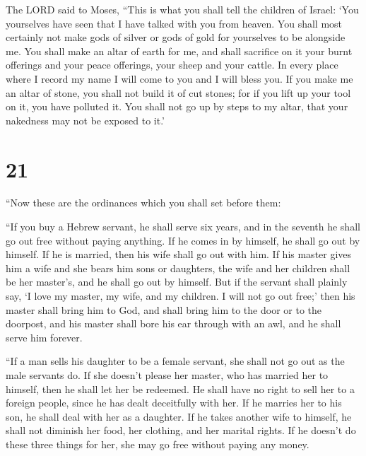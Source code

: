  The LORD said to Moses, ``This is what you shall tell
the children of Israel: `You yourselves have seen that I have talked
with you from heaven.  You shall most certainly not make
gods of silver or gods of gold for yourselves to be alongside me.
 You shall make an altar of earth for me, and shall
sacrifice on it your burnt offerings and your peace offerings, your
sheep and your cattle. In every place where I record my name I will come
to you and I will bless you.  If you make me an altar of
stone, you shall not build it of cut stones; for if you lift up your
tool on it, you have polluted it.  You shall not go up by
steps to my altar, that your nakedness may not be exposed to it.'

\hypertarget{section-20}{%
\section{21}\label{section-20}}

 ``Now these are the ordinances which you shall set before
them:

 ``If you buy a Hebrew servant, he shall serve six years,
and in the seventh he shall go out free without paying anything.
 If he comes in by himself, he shall go out by himself. If
he is married, then his wife shall go out with him.  If
his master gives him a wife and she bears him sons or daughters, the
wife and her children shall be her master's, and he shall go out by
himself.  But if the servant shall plainly say, `I love my
master, my wife, and my children. I will not go out free;'
 then his master shall bring him to God, and shall bring
him to the door or to the doorpost, and his master shall bore his ear
through with an awl, and he shall serve him forever.

 ``If a man sells his daughter to be a female servant, she
shall not go out as the male servants do.  If she doesn't
please her master, who has married her to himself, then he shall let her
be redeemed. He shall have no right to sell her to a foreign people,
since he has dealt deceitfully with her.  If he marries
her to his son, he shall deal with her as a daughter.  If
he takes another wife to himself, he shall not diminish her food, her
clothing, and her marital rights.  If he doesn't do these
three things for her, she may go free without paying any money.

